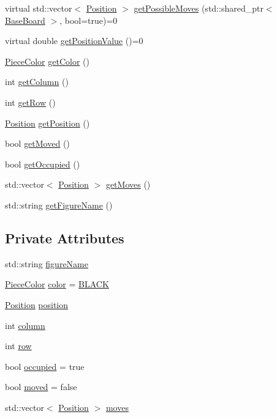 \begin{DoxyCompactItemize}
\item 
virtual std\+::vector$<$ \hyperlink{struct_position}{Position} $>$ \hyperlink{class_piece_a8891924c280568529878549f59541925}{get\+Possible\+Moves} (std\+::shared\+\_\+ptr$<$ \hyperlink{class_base_board}{Base\+Board} $>$, bool=true)=0
\item 
virtual double \hyperlink{class_piece_a4adfa58b4f0368c9a5859afcf294e0a4}{get\+Position\+Value} ()=0
\item 
\hyperlink{_piece_8h_ad7595c48bb74c0dd2a7648712a2d4985}{Piece\+Color} \hyperlink{class_piece_a184ce3e31f7b4d8a3d616a60fe60522e}{get\+Color} ()
\item 
int \hyperlink{class_piece_a3396fcbbe54260076bf2f6a39b0fb920}{get\+Column} ()
\item 
int \hyperlink{class_piece_a070f593242fb8417429ac989184e682b}{get\+Row} ()
\item 
\hyperlink{struct_position}{Position} \hyperlink{class_piece_a2dee0ebeffdb733e17574471c441e06d}{get\+Position} ()
\item 
bool \hyperlink{class_piece_ad23431fecbbedcff824dd38ffa6a47a1}{get\+Moved} ()
\item 
bool \hyperlink{class_piece_abde93826a7b04b9e0f9739b11df0629e}{get\+Occupied} ()
\item 
std\+::vector$<$ \hyperlink{struct_position}{Position} $>$ \hyperlink{class_piece_a10eddaa8ade831cfee1c17b94bfcac09}{get\+Moves} ()
\item 
std\+::string \hyperlink{class_piece_a094d0d28514219ab3f155d9241bb8f22}{get\+Figure\+Name} ()
\end{DoxyCompactItemize}
\subsection*{Private Attributes}
\begin{DoxyCompactItemize}
\item 
std\+::string \hyperlink{class_piece_af2fe809fd0d35d167f2419768e49fd3a}{figure\+Name}
\item 
\hyperlink{_piece_8h_ad7595c48bb74c0dd2a7648712a2d4985}{Piece\+Color} \hyperlink{class_piece_a8dfe0501fe95a1a7618cf5ad3b9fda69}{color} = \hyperlink{_piece_8h_ad7595c48bb74c0dd2a7648712a2d4985af77fb67151d0c18d397069ad8c271ba3}{B\+L\+A\+CK}
\item 
\hyperlink{struct_position}{Position} \hyperlink{class_piece_a818688fca11efe2957b0605bb2976f49}{position}
\item 
int \hyperlink{class_piece_aa8f39e11280395103164f6ae07398c82}{column}
\item 
int \hyperlink{class_piece_ac6ef7c474f20562cb629c2452ce0631d}{row}
\item 
bool \hyperlink{class_piece_a063178abee009388c7d07e112efc3be4}{occupied} = true
\item 
bool \hyperlink{class_piece_ad1320904ecb8565e96d6020f857c990c}{moved} = false
\item 
std\+::vector$<$ \hyperlink{struct_position}{Position} $>$ \hyperlink{class_piece_a22ef4ba5ffcc5767149332320230373e}{moves}
\end{DoxyCompactItemize}
